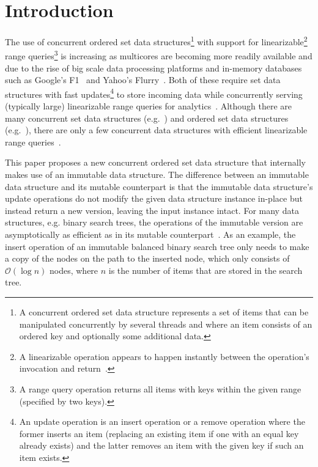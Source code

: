 \documentclass[a4paper,UKenglish]{oasics}
\begin{document}
\section{Introduction\label{sec:intro}}
The use of concurrent ordered set data structures\footnote{A concurrent ordered set data structure represents a set of items that can be manipulated concurrently by several threads and where an item consists of an ordered key and optionally some additional data.} with support for linearizable\footnote{A linearizable operation appears to happen instantly between the operation's invocation and return~\cite{HerlihyLinearizability}.} range queries\footnote{A range query operation returns all items with keys within the given range (specified by two keys).} is increasing as multicores are becoming more readily available and due to the rise of big scale data processing platforms and in-memory databases such as Google's F1~\cite{ShuteF1} and Yahoo's Flurry~\cite{Furry}.
Both of these require set data structures with fast updates\footnote{An update operation is an insert operation or a remove operation where the former inserts an item (replacing an existing item if one with an equal key already exists) and the latter removes an item with the given key if such an item exists.} to store incoming data while concurrently serving (typically large) linearizable range queries for analytics~\cite{BasinKiWi}. %
Although there are many concurrent set data structures (e.g.~\cite{shalevExtendableLockFreeHash, michaelHashTable, ProkopecCtrie}) and ordered set data structures (e.g.~\cite{fraser2004practical,NatarajanFastLockFree,NBKASearchTree}), there are only a few concurrent data structures with efficient linearizable range queries~\cite{RangeQKArySeachTree,AvniLeaplist,CFRangeQueries,CATreeLCPC,ChatterjeeLFRangeQueries,BasinKiWi}.

This paper proposes a new concurrent ordered set data structure that internally makes use of an immutable data structure. %
The difference between an immutable data structure and its mutable counterpart is that the immutable data structure's update operations do not modify the given data structure instance in-place but instead return a new version, leaving the input instance intact. %
For many data structures, e.g. binary search trees, the operations of the immutable version are asymptotically as efficient as in its mutable counterpart~\cite{okasaki1999purely}.
As an example, the insert operation of an immutable balanced binary search tree only needs to make a copy of the nodes on the path to the inserted node, which only consists of $\mathcal{O}(\log{}n)$ nodes, where $n$ is the number of items that are stored in the search tree. 
\end{document}
